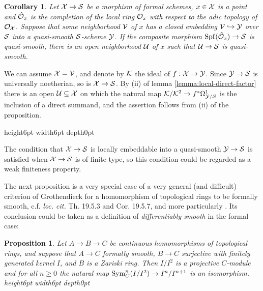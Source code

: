\documentclass{article}
\theoremstyle{change}
\newtheorem{prop}[subsubsection]{Proposition}
\newtheorem{cor}[subsubsection]{Corollary}
\numberwithin{equation}{subsubsection}
\newcommand{\demobox}{\vrule height6pt width6pt depth0pt}
\newcommand{\nodemo}{\unskip\nobreak\hfil\qquad
\demobox\parfillskip=0pt\par}
\newenvironment{demo}{\noindent{\it Proof.}}
{{\unskip\nobreak\hfil\qquad
\demobox\parfillskip=0pt\par}
\medskip}
\begin{document}
\begin{cor}
  Let ${\cal X}\to{\cal S}$ be a morphism of formal schemes, $x\in{\cal X}$ is a
  point and $\hat{{\cal O}}_x$ is the completion of the local ring ${\cal O}_x$ with
  respect to the adic topology of ${\cal O}_{\cal X}$. Suppose that some
  neighborhood ${\cal V}$ of $x$ has a closed embedding ${\cal V}\hookrightarrow{\cal Y}$ over
  ${\cal S}$ into a quasi-smooth ${\cal S}$-scheme ${\cal Y}$. If the composite
  morphism ${\operatorname{Spf}({\hat{{\cal O}}_x})}\to{\cal S}$ is quasi-smooth, there is an open
  neighborhood ${\cal U}$ of $x$ such that ${\cal U}\to{\cal S}$ is quasi-smooth.
\end{cor}
\begin{demo}
  We can assume ${\cal X}={\cal V}$, and denote by ${\cal K}$ the ideal of
  $f:{\cal X}\to{\cal Y}$. Since ${\cal Y}\to{\cal S}$ is universally noetherian, so is
  ${\cal X}\to{\cal S}$. By (ii) of lemma \ref{lemma:local-direct-factor} there
  is an open ${\cal U}\subseteq{\cal X}$ on which the natural map
  ${\cal K}/{\cal K}^2\to f^*\Omega^1_{{\cal Y}/{\cal S}}$ is the inclusion of a direct
  summand, and the assertion follows from (ii) of the proposition.
\end{demo}

The condition that ${\cal X}\to{\cal S}$ is locally embeddable into a
quasi-smooth ${\cal Y}\to{\cal S}$ is satisfied when ${\cal X}\to{\cal S}$ is of finite
type, so this condition could be regarded as a weak finiteness
property.

The next proposition is a very special case of a very general (and
difficult) criterion of Grothendieck for a homomorphism of topological
rings to be formally smooth, c.f.  \textit{loc. cit.} Th. 19.5.3 and
Cor. 19.5.7, and more particularly \cite[$0_{IV}$ Rem. 19.5.8]{EGA}.
Its conclusion could be taken as a definition of
\textit{differentiably smooth} in the formal case:

\begin{prop}\label{prop:Grothendieck-formal-smoothness}
  Let $A\to B\to C$ be continuous homomorphisms of topological rings,
  and suppose that $A\to C$ formally smooth, $B\to C$ surjective with
  finitely generated kernel $I$, and $B$ is a Zariski ring. Then
  $I/I^2$ is a projective $C$-module and for all $n\ge0$ the natural
  map ${\textrm{Sym}}_C^n(I/I^2)\to I^n/I^{n+1}$ is an isomorphism.\nodemo
\end{prop}
\end{document}
